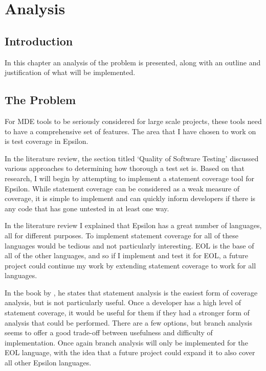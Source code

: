 \chapter{Analysis}
\label{chap:Analysis}

\section{Introduction}
In this chapter an analysis of the problem is presented, along with an outline and justification of what will be implemented.

\section{The Problem}

For MDE tools to be seriously considered for large scale projects, these tools need to have a comprehensive set of features. The area that I have chosen to work on is test coverage in Epsilon.

In the literature review, the section titled `Quality of Software Testing' discussed various approaches to determining how thorough a test set is. Based on that research, I will begin by attempting to implement a statement coverage tool for Epsilon. While statement coverage can be considered as a weak measure of coverage, it is simple to implement and can quickly inform developers if there is any code that has gone untested in at least one way.


In the literature review I explained that Epsilon has a great number of languages, all for different purposes. To implement statement coverage for all of these languages would be tedious and not particularly interesting. EOL is the base of all of the other languages, and so if I implement and test it for EOL, a future project could continue my work by extending statement coverage to work for all languages.

In the book by \citet{Myers:2004:AST:983238}, he states that statement analysis is the easiest form of coverage analysis, but is not particularly useful. Once a developer has a high level of statement coverage, it would be useful for them if they had a stronger form of analysis that could be performed. There are a few options, but branch analysis seems to offer a good trade-off between usefulness and difficulty of implementation. Once again branch analysis will only be implemented for the EOL language, with the idea that a future project could expand it to also cover all other Epsilon languages.

